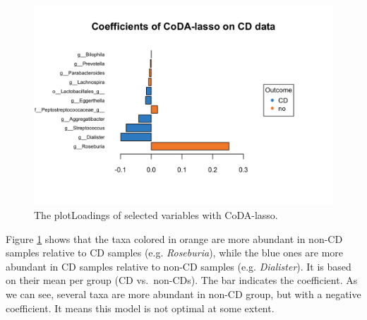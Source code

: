 \documentclass[openany]{book}
\newenvironment{Shaded}{\begin{snugshade}}{\end{snugshade}}
\newcommand{\KeywordTok}[1]{\textcolor[rgb]{0.13,0.29,0.53}{\textbf{#1}}}
\newcommand{\DataTypeTok}[1]{\textcolor[rgb]{0.13,0.29,0.53}{#1}}
\newcommand{\StringTok}[1]{\textcolor[rgb]{0.31,0.60,0.02}{#1}}
\newcommand{\CommentTok}[1]{\textcolor[rgb]{0.56,0.35,0.01}{\textit{#1}}}
\newcommand{\OperatorTok}[1]{\textcolor[rgb]{0.81,0.36,0.00}{\textbf{#1}}}
\newcommand{\NormalTok}[1]{#1}
\begin{document}
\begin{figure}

{\centering \includegraphics[width=1\linewidth]{./Generated_plots/loadcodaCD-1} 

}

\caption{The plotLoadings of selected variables with CoDA-lasso.}\label{fig:loadcodaCD}
\end{figure}

Figure \ref{fig:loadcodaCD} shows that the taxa colored in orange are
more abundant in non-CD samples relative to CD samples (e.g.
\emph{Roseburia}), while the blue ones are more abundant in CD samples
relative to non-CD samples (e.g. \emph{Dialister}). It is based on their
mean per group (CD vs.~non-CDs). The bar indicates the coefficient. As
we can see, several taxa are more abundant in non-CD group, but with a
negative coefficient. It means this model is not optimal at some extent.

\begin{Shaded}
\end{Shaded}
\end{document}
